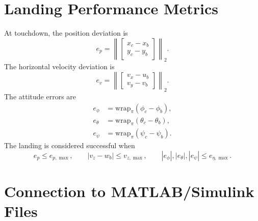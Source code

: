 \documentclass[12pt,a4paper]{article}
\begin{document}
\section{Landing Performance Metrics}

At touchdown, the position deviation is
\begin{equation}
e_p=\left\|
\begin{bmatrix}
x_c-x_b\\
y_c-y_b
\end{bmatrix}
\right\|_2.
\end{equation}
The horizontal velocity deviation is
\begin{equation}
e_v=\left\|
\begin{bmatrix}
v_x-u_b\\
v_y-v_b
\end{bmatrix}
\right\|_2.
\end{equation}
The attitude errors are
\begin{align}
e_{\phi}&=\mathrm{wrap}_{\pi}(\phi_c-\phi_b),\\
e_{\theta}&=\mathrm{wrap}_{\pi}(\theta_c-\theta_b),\\
e_{\psi}&=\mathrm{wrap}_{\pi}(\psi_c-\psi_b).
\end{align}
The landing is considered successful when
\begin{equation}
e_p \leq e_{p,\max},\qquad
|v_z-w_b| \leq v_{z,\max},\qquad
|e_{\phi}|,|e_{\theta}|,|e_{\psi}| \leq e_{\eta,\max}.
\end{equation}

\section{Connection to MATLAB/Simulink Files}
\end{document}
